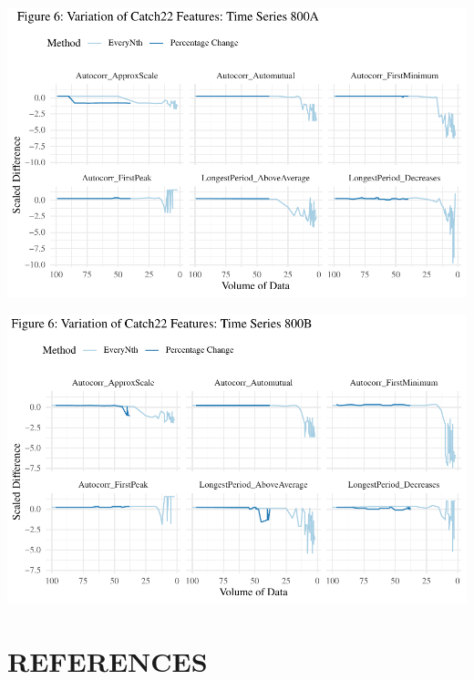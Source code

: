 \documentclass{article}
\begin{document}
\includegraphics{210431461_CSC8639_Dissertation_files/figure-latex/Catch22Variation800A-1.pdf}

\includegraphics{210431461_CSC8639_Dissertation_files/figure-latex/Catch22Variation800B-1.pdf}

\newpage

\hypertarget{references}{%
\section*{REFERENCES}\label{references}}
\end{document}

